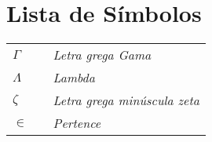 \chapter*{Lista de Símbolos}

\begin{tabular}{lll}
  $\Gamma$   & & {\em Letra grega Gama} \\
  $\Lambda$     & & {\em Lambda}\\
  $\zeta$    & & {\em Letra grega minúscula zeta}\\
  $\in$     & & {\em Pertence}\\
\end{tabular}
\clearpage